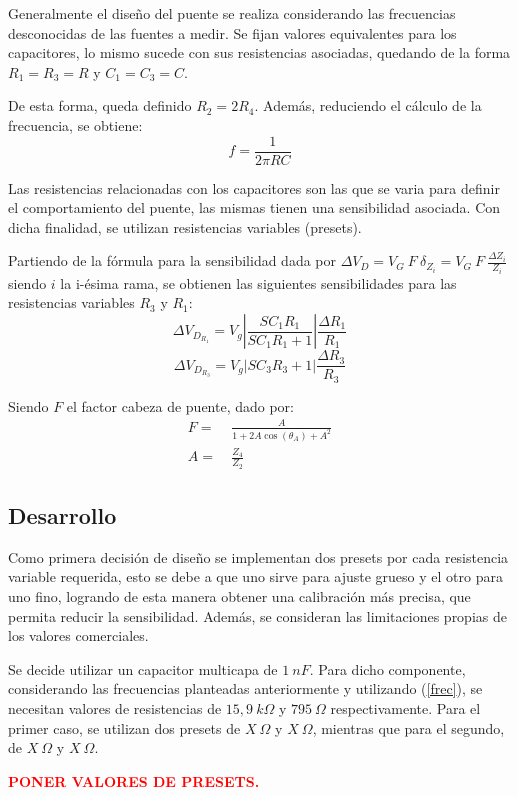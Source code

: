 Generalmente el diseño del puente se realiza considerando las frecuencias desconocidas de las fuentes a medir. Se fijan valores equivalentes para los capacitores, lo mismo sucede con sus resistencias asociadas, quedando de la forma $R_1=R_3=R$ y $C_1=C_3=C$.

De esta forma, queda definido $R_2=2R_4$. Además, reduciendo el cálculo de la frecuencia, se obtiene:
\begin{equation}
f=\frac{1}{2\pi RC}
\label{frec}
\end{equation}

Las resistencias relacionadas con los capacitores son las que se varia para definir el comportamiento del puente, las mismas tienen una sensibilidad asociada. Con dicha finalidad, se utilizan resistencias variables (presets). 

Partiendo de la fórmula para la sensibilidad dada por $\Delta V_D=V_G \ F \ \delta_{Z_i}=V_G \ F \ \frac{\Delta Z_i}{Z_i}$ siendo $i$ la i-ésima rama, se obtienen las siguientes sensibilidades para las resistencias variables $R_3$ y $R_1$:
\begin{equation}
\Delta V_{D_{R_1}}=V_g\left|\frac{SC_1R_1}{SC_1R_1+1}\right|\frac{\Delta R_1}{R_1}
\end{equation}
\begin{equation}
\Delta V_{D_{R_3}}=V_g\left|SC_3R_3+1\right|\frac{\Delta R_3}{R_3}
\end{equation}

Siendo $F$ el factor cabeza de puente, dado por:
\begin{equation}
\begin{split}
F=& \ \frac{A}{1+2A\cos(\theta_A)+A^2} \\
A=& \ \frac{Z_4}{Z_2}
\end{split}
\label{cabeza_de_puente}
\end{equation} 

\subsection{Desarrollo}

Como primera decisión de diseño se implementan dos presets por cada resistencia variable requerida, esto se debe a que uno sirve para ajuste grueso y el otro para uno fino, logrando de esta manera obtener una calibración más precisa, que permita reducir la sensibilidad. Además, se consideran las limitaciones propias de los valores comerciales.

Se decide utilizar un capacitor multicapa de $1 \ nF$. Para dicho componente, considerando las frecuencias planteadas anteriormente y utilizando (\ref{frec}), se necesitan valores de resistencias de $15,9 \ k\Omega$ y $795 \ \Omega$ respectivamente. Para el primer caso, se utilizan dos presets de $X \ \Omega$ y $X \ \Omega$, mientras que para el segundo, de $X \ \Omega$ y $X \ \Omega$.
\begin{center}
	\huge{\textcolor{red}{\textbf{PONER VALORES DE PRESETS.}}}
\end{center}

